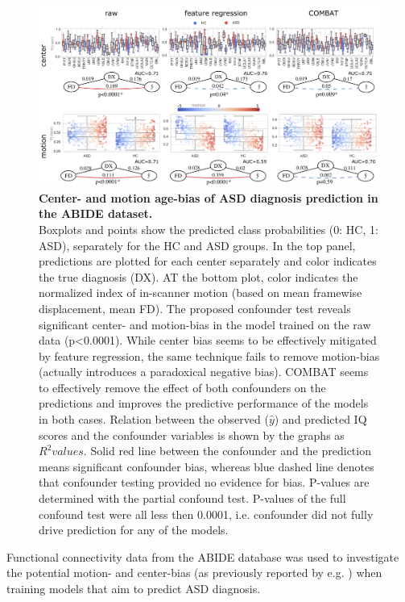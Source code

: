 \documentclass{article}
\begin{document}
\begin{figure}[!b]
  \centering
  \includegraphics[width=0.75\paperwidth]{fig/fig_abide.png}
  \caption{\textbf{Center- and motion age-bias of ASD diagnosis prediction in the ABIDE dataset.} \\
  Boxplots and points show the predicted class probabilities (0: HC, 1: ASD), separately for the HC and ASD groups. In the top panel, predictions are plotted for each center separately and color indicates the true diagnosis (DX). AT the bottom plot, color indicates the normalized index of in-scanner motion (based on mean framewise displacement, mean FD). The proposed confounder test reveals significant center- and motion-bias in the model trained on the raw data (p<0.0001). While center bias seems to be effectively mitigated by feature regression, the same technique fails to remove motion-bias (actually introduces a paradoxical negative bias). COMBAT seems to effectively remove the effect of both confounders on the predictions and improves the predictive performance of the models in both cases.
  Relation between the observed ($\hat{y}$) and predicted IQ scores and the confounder variables is shown by the graphs as $R^2 values$. Solid red line between the confounder and the prediction means significant confounder bias, whereas blue dashed line denotes that confounder testing provided no evidence for bias. P-values are determined with the partial confound test. P-values of the full confound test were all less then 0.0001, i.e. confounder did not fully drive prediction for any of the models.
  }
  \label{fig:abide}
\end{figure}

Functional connectivity data from the ABIDE \citep{di2014autism} database was used to investigate the potential motion- and center-bias (as previously reported by e.g. \cite{spisak2014voxel, spisak2019optimal, gotts2013perils}) when training models that aim to predict ASD diagnosis.
\end{document}
